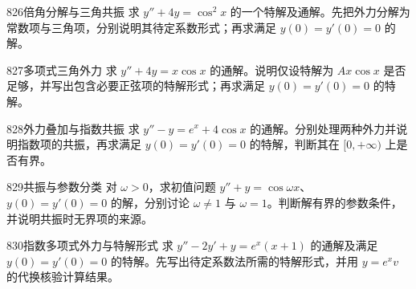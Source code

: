 \begin{exercise}{826}{倍角分解与三角共振}
求 $y''+4y=\cos^2x$ 的一个特解及通解。先把外力分解为常数项与三角项，分别说明其待定系数形式；再求满足 $y(0)=y'(0)=0$ 的解。
\end{exercise}
\begin{exercise}{827}{多项式三角外力}
求 $y''+4y=x\cos x$ 的通解。说明仅设特解为 $Ax\cos x$ 是否足够，并写出包含必要正弦项的特解形式；再求满足 $y(0)=y'(0)=0$ 的特解。
\end{exercise}
\begin{exercise}{828}{外力叠加与指数共振}
求 $y''-y=e^x+4\cos x$ 的通解。分别处理两种外力并说明指数项的共振，再求满足 $y(0)=y'(0)=0$ 的特解，判断其在 $[0,+\infty)$ 上是否有界。
\end{exercise}
\begin{exercise}{829}{共振与参数分类}
对 $\omega>0$，求初值问题 $y''+y=\cos\omega x$、$y(0)=y'(0)=0$ 的解，分别讨论 $\omega\ne1$ 与 $\omega=1$。判断解有界的参数条件，并说明共振时无界项的来源。
\end{exercise}
\begin{exercise}{830}{指数多项式外力与特解形式}
求 $y''-2y'+y=e^x(x+1)$ 的通解及满足 $y(0)=y'(0)=0$ 的特解。先写出待定系数法所需的特解形式，并用 $y=e^xv$ 的代换核验计算结果。
\end{exercise}
